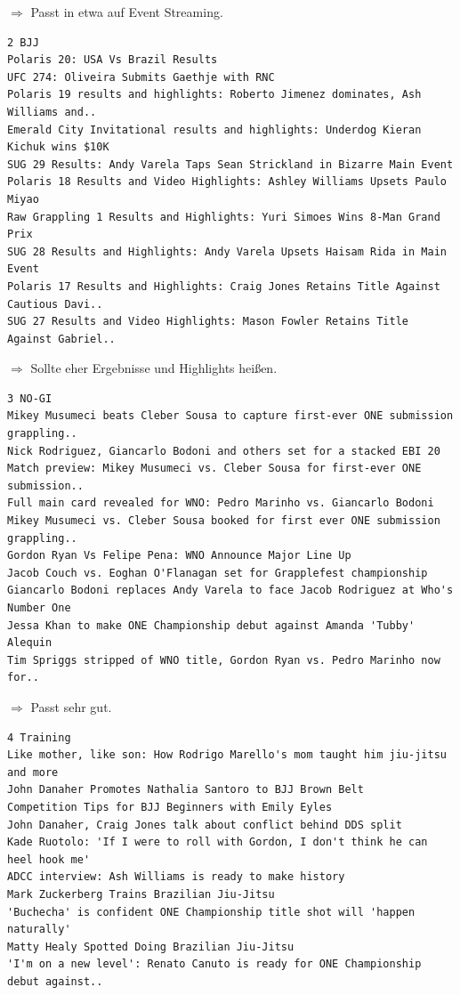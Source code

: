 \noindent$\Rightarrow$ Passt in etwa auf Event Streaming.

{\color{MidnightBlue}
\begin{lstlisting}
2 BJJ
Polaris 20: USA Vs Brazil Results
UFC 274: Oliveira Submits Gaethje with RNC
Polaris 19 results and highlights: Roberto Jimenez dominates, Ash Williams and..
Emerald City Invitational results and highlights: Underdog Kieran Kichuk wins $10K
SUG 29 Results: Andy Varela Taps Sean Strickland in Bizarre Main Event
Polaris 18 Results and Video Highlights: Ashley Williams Upsets Paulo Miyao
Raw Grappling 1 Results and Highlights: Yuri Simoes Wins 8-Man Grand Prix
SUG 28 Results and Highlights: Andy Varela Upsets Haisam Rida in Main Event
Polaris 17 Results and Highlights: Craig Jones Retains Title Against Cautious Davi..
SUG 27 Results and Video Highlights: Mason Fowler Retains Title Against Gabriel..
\end{lstlisting}}

\noindent$\Rightarrow$ Sollte eher Ergebnisse und Highlights hei{\ss}en.

{\color{MidnightBlue}
\begin{lstlisting}
3 NO-GI
Mikey Musumeci beats Cleber Sousa to capture first-ever ONE submission grappling..
Nick Rodriguez, Giancarlo Bodoni and others set for a stacked EBI 20
Match preview: Mikey Musumeci vs. Cleber Sousa for first-ever ONE submission..
Full main card revealed for WNO: Pedro Marinho vs. Giancarlo Bodoni
Mikey Musumeci vs. Cleber Sousa booked for first ever ONE submission grappling..
Gordon Ryan Vs Felipe Pena: WNO Announce Major Line Up
Jacob Couch vs. Eoghan O'Flanagan set for Grapplefest championship
Giancarlo Bodoni replaces Andy Varela to face Jacob Rodriguez at Who's Number One
Jessa Khan to make ONE Championship debut against Amanda 'Tubby' Alequin
Tim Spriggs stripped of WNO title, Gordon Ryan vs. Pedro Marinho now for..
\end{lstlisting}}

\noindent$\Rightarrow$ Passt sehr gut.

{\color{MidnightBlue}
\begin{lstlisting}
4 Training
Like mother, like son: How Rodrigo Marello's mom taught him jiu-jitsu and more
John Danaher Promotes Nathalia Santoro to BJJ Brown Belt
Competition Tips for BJJ Beginners with Emily Eyles
John Danaher, Craig Jones talk about conflict behind DDS split
Kade Ruotolo: 'If I were to roll with Gordon, I don't think he can heel hook me'
ADCC interview: Ash Williams is ready to make history
Mark Zuckerberg Trains Brazilian Jiu-Jitsu
'Buchecha' is confident ONE Championship title shot will 'happen naturally'
Matty Healy Spotted Doing Brazilian Jiu-Jitsu
'I'm on a new level': Renato Canuto is ready for ONE Championship debut against..
\end{lstlisting}}

